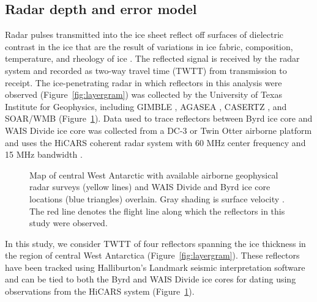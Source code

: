 


\subsection{Radar depth and error model}
 Radar pulses transmitted into the ice sheet reflect off surfaces of dielectric contrast in the ice that are the result of variations in ice fabric, composition, temperature, and rheology of ice \citep{fujita2000}. The reflected signal is received by the radar system and recorded as two-way travel time (TWTT) from transmission to receipt.  The ice-penetrating radar in which reflectors in this analysis were observed (Figure~\ref{fig:layergram}) was collected by the University of Texas Institute for Geophysics, including GIMBLE \citep{gimble2017}, AGASEA \citep{holt2006}, CASERTZ \citep{morse2002}, and SOAR/WMB \citep{luyendyk2003} (Figure~\ref{fig:radarmap}). Data used to trace reflectors between Byrd ice core and WAIS Divide ice core was collected from a DC-3 or Twin Otter airborne platform and uses the HiCARS coherent radar system with 60 MHz center frequency and 15 MHz bandwidth \citep{peters2005}.%

\begin{figure}[h]
\centering
{}
\caption{Map of central West Antarctic with available airborne geophysical radar surveys (yellow lines) and  WAIS Divide and Byrd ice core locations (blue triangles) overlain. Gray shading is surface velocity \citep{rignot2011}. The red line denotes the flight line along which the reflectors in this study were observed. }
\label{fig:radarmap}
\end{figure}



In this study, we consider TWTT of four reflectors spanning the ice thickness in the region of central West Antarctica (Figure~\ref{fig:layergram}). These reflectors have been tracked using Halliburton's Landmark seismic interpretation software and can be tied to both the Byrd and WAIS Divide ice cores for dating using observations from the HiCARS system (Figure~\ref{fig:radarmap}). %

